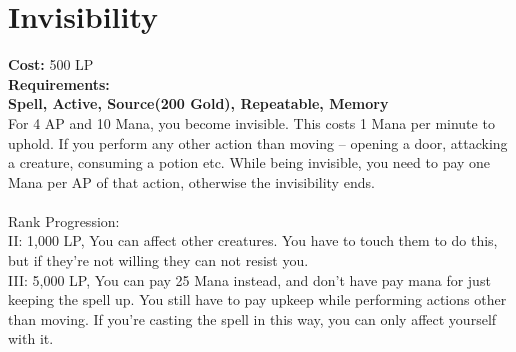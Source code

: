 \section{Invisibility}\label{spell:invisibility}
\textbf{Cost:} 500 LP\\
\textbf{Requirements:}\\
\textbf{Spell, Active, Source(200 Gold), Repeatable, Memory}\\
For 4 AP and 10 Mana, you become invisible.
This costs 1 Mana per minute to uphold.
If you perform any other action than moving -- opening a door, attacking a creature, consuming a potion etc.
While being invisible, you need to pay one Mana per AP of that action, otherwise the invisibility ends.\\
\\
Rank Progression:\\
II: 1,000 LP, You can affect other creatures.
You have to touch them to do this, but if they're not willing they can not resist you.\\

III: 5,000 LP, You can pay 25 Mana instead, and don't have pay mana for just keeping the spell up.
You still have to pay upkeep while performing actions other than moving.
If you're casting the spell in this way, you can only affect yourself with it.\\